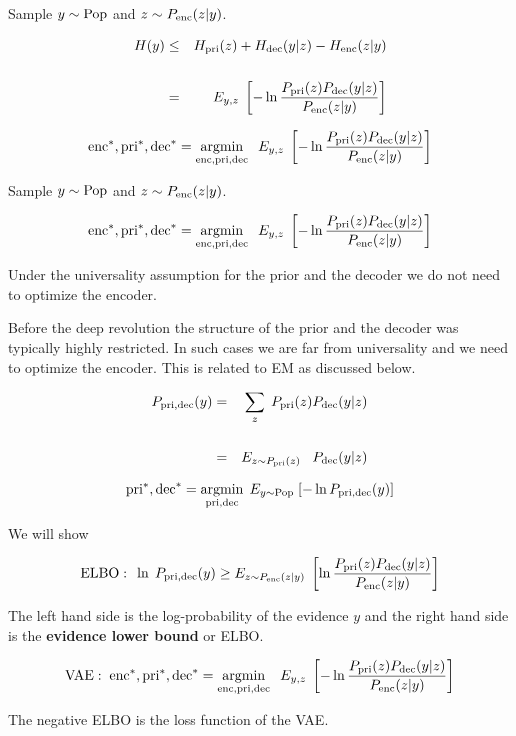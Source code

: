 {
Sample $y \sim \mathrm{Pop}$ and $z \sim P_{\mathrm{enc}}(z|y)$.

\vfill
\begin{eqnarray*}
H(y) & \leq & H_{\mathrm{pri}}(z) + H_{\mathrm{dec}}(y|z) - H_{\mathrm{enc}}(z|y) \\
\\
 & = & E_{y,z}\;\left[- \ln \frac{P_{\mathrm{pri}}(z)P_{\mathrm{dec}}(y|z)}{P_{\mathrm{enc}}(z|y)}\right]
\end{eqnarray*}

\vfill
$$\mathrm{enc}^*,\mathrm{pri}^*,\mathrm{dec}^* = \operatorname*{argmin}_{\mathrm{enc},\mathrm{pri},\mathrm{dec}}\;\;E_{y,z}\;\left[- \ln \frac{P_{\mathrm{pri}}(z)P_{\mathrm{dec}}(y|z)}{P_{\mathrm{enc}}(z|y)}\right]$$


Sample $y \sim \mathrm{Pop}$ and $z \sim P_{\mathrm{enc}}(z|y)$.

\vfill
$$\mathrm{enc}^*,\mathrm{pri}^*,\mathrm{dec}^* = \operatorname*{argmin}_{\mathrm{enc},\mathrm{pri},\mathrm{dec}}\;\;E_{y,z}\;\left[- \ln \frac{P_{\mathrm{pri}}(z)P_{\mathrm{dec}}(y|z)}{P_{\mathrm{enc}}(z|y)}\right]$$

\vfill
Under the universality assumption for the prior and the decoder we do not need to optimize the encoder.

\vfill
Before the deep revolution the structure of the prior and the decoder was typically highly restricted.
In such cases we are far from universality and we need to optimize the encoder.  This is related to EM  as discussed below.


\begin{eqnarray*}
P_{\mathrm{pri},\mathrm{dec}}(y) & = & \sum_z\;P_{\mathrm{pri}}(z)P_{\mathrm{dec}}(y|z) \\
\\
& = & E_{z\sim P_{\mathrm{pri}}(z)}\;\;\;P_{\mathrm{dec}}(y|z)
\end{eqnarray*}


\vfill
$$\mathrm{pri}^*,\mathrm{dec}^* = \operatorname*{argmin}_{\mathrm{pri},\mathrm{dec}}\;E_{y \sim \mathrm{Pop}}\;[- \ln P_{\mathrm{pri},\mathrm{dec}}(y)]$$


We will show

$$\mathrm{ELBO:}\;\;\ln \;P_{\mathrm{pri},\mathrm{dec}}(y) \geq E_{z\sim P_{\mathrm{enc}}(z|y)}\;\left[\ln \frac{P_{\mathrm{pri}}(z)P_{\mathrm{dec}}(y|z)}{P_{\mathrm{enc}}(z|y)}\right]$$

\vfill
The left hand side is the log-probability of the evidence $y$ and the right hand side is the {\bf evidence lower bound} or ELBO.

\vfill
$$\mathrm{VAE:}\;\; \mathrm{enc}^*,\mathrm{pri}^*,\mathrm{dec}^* = \operatorname*{argmin}_{\mathrm{enc},\mathrm{pri},\mathrm{dec}}\;\;E_{y,z}\;\left[- \ln \frac{P_{\mathrm{pri}}(z)P_{\mathrm{dec}}(y|z)}{P_{\mathrm{enc}}(z|y)}\right]$$

\vfill
The negative ELBO is the loss function of the VAE.

}
